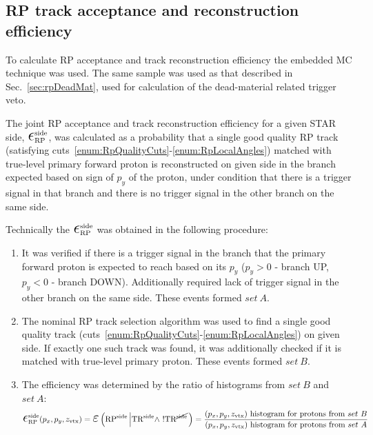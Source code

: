 \subsection{RP track acceptance and reconstruction efficiency}\label{sec:rpAccAndEff}

To calculate RP acceptance and track reconstruction efficiency the embedded MC technique was used. The same sample was used as that described in Sec.~\ref{sec:rpDeadMat}, used for calculation of the dead-material related trigger veto.

The joint RP acceptance and track reconstruction efficiency for a given STAR side, $\mbox{\LARGE$\epsilon$}_{\text{RP}}^{\text{side}}$, was calculated as a probability that a single good quality RP track (satisfying cuts~\ref{enum:RpQualityCuts}-\ref{enum:RpLocalAngles}) matched with true-level primary forward proton is reconstructed on given side in the branch expected based on sign of $p_{y}$ of the proton, under condition that there is a trigger signal in that branch and there is no trigger signal in the other branch on the same side.

Technically the $\mbox{\LARGE$\epsilon$}_{\text{RP}}^{\text{side}}$ was obtained in the following procedure:
\begin{enumerate}
	\item It was verified if there is a trigger signal in the branch that the primary forward proton is expected to reach based on its $p_{y}$ ($p_{y}>0$ - branch UP, $p_{y}<0$ - branch DOWN). Additionally required lack of trigger signal in the other branch on the same side. These events formed $set~A$.
	\item The nominal RP track selection algorithm was used to find a single good quality track (cuts~\ref{enum:RpQualityCuts}-\ref{enum:RpLocalAngles}) on given side. If exactly one such track was found, it was additionally checked if it is matched with true-level primary proton. These events formed $set~B$.
	\item The efficiency was determined by the ratio of histograms from $set~B$ and $set~A$:
	\begin{equation}\label{eq:rpEffDef}
 \mbox{\LARGE$\epsilon$}_{\text{RP}}^{\text{side}}(p_{x}, p_{y}, z_{\text{vtx}}) = \mbox{\LARGE$\varepsilon$}\left(\RPSIDE\left|\TRSIDE\land~!\TRNSIDE\right.\right) = %
 \frac{(p_{x}, p_{y}, z_{\text{vtx}})~\text{histogram for protons from}~set~B}{(p_{x}, p_{y}, z_{\text{vtx}})~\text{histogram for protons from}~set~A}
  \end{equation}
	
\end{enumerate}

